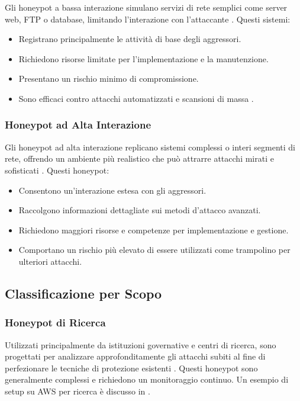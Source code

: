 Gli honeypot a bassa interazione simulano servizi di rete semplici come server web, FTP o database, limitando l'interazione con l'attaccante \cite{vito2024}. Questi sistemi:
\begin{itemize}
    \item Registrano principalmente le attività di base degli aggressori.
    \item Richiedono risorse limitate per l'implementazione e la manutenzione.
    \item Presentano un rischio minimo di compromissione.
    \item Sono efficaci contro attacchi automatizzati e scansioni di massa \cite{nordvpn}.
\end{itemize}

\subsubsection{Honeypot ad Alta Interazione}
\label{subsubsec:alta_interazione}

Gli honeypot ad alta interazione replicano sistemi complessi o interi segmenti di rete, offrendo un ambiente più realistico che può attrarre attacchi mirati e sofisticati \cite{vito2024}. Questi honeypot:
\begin{itemize}
    \item Consentono un'interazione estesa con gli aggressori.
    \item Raccolgono informazioni dettagliate sui metodi d'attacco avanzati.
    \item Richiedono maggiori risorse e competenze per implementazione e gestione.
    \item Comportano un rischio più elevato di essere utilizzati come trampolino per ulteriori attacchi.
\end{itemize}

\subsection{Classificazione per Scopo}
\label{subsec:class_scopo}

\subsubsection{Honeypot di Ricerca}
\label{subsubsec:ricerca}

Utilizzati principalmente da istituzioni governative e centri di ricerca, sono progettati per analizzare approfonditamente gli attacchi subiti al fine di perfezionare le tecniche di protezione esistenti \cite{proofpoint2024}. Questi honeypot sono generalmente complessi e richiedono un monitoraggio continuo. Un esempio di setup su AWS per ricerca è discusso in \cite{tsang_2022}.

